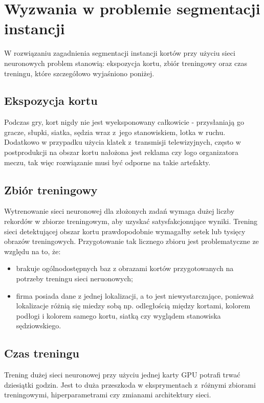 \section{Wyzwania w problemie segmentacji instancji}
\label{sec:wyzwania}

W rozwiązaniu zagadnienia segmentacji instancji kortów przy użyciu sieci neuronowych problem stanowią: ekspozycja kortu, zbiór treningowy oraz czas treningu, które szczegółowo wyjaśniono poniżej.

\subsection*{Ekspozycja kortu}

Podczas gry, kort nigdy nie jest wyeksponowany całkowicie - przysłaniają go gracze, słupki, siatka, sędzia wraz z~jego stanowiskiem, lotka w ruchu.
Dodatkowo w przypadku użycia klatek z~transmisji telewizyjnych, często w postprodukcji na obszar kortu nałożona jest reklama czy logo organizatora meczu,  tak więc rozwiązanie musi być odporne na takie artefakty.

\subsection*{Zbiór treningowy}

Wytrenowanie sieci neuronowej dla złożonych zadań wymaga dużej liczby rekordów w zbiorze treningowym, aby uzyskać satysfakcjonujące wyniki.
Trening sieci detektującej obszar kortu prawdopodobnie wymagałby setek lub tysięcy obrazów treningowych.
Przygotowanie tak licznego zbioru jest problematyczne ze względu na to, że:

\begin{itemize}
	\item brakuje ogólnodostępnych baz z obrazami kortów przygotowanych na potrzeby treningu sieci neruonowych;
	\item firma posiada dane z jednej lokalizacji, a to jest niewystarczające, ponieważ lokalizacje różnią się miedzy sobą np. odległością między kortami, kolorem podłogi i kolorem samego kortu, siatką czy wyglądem stanowiska sędziowskiego.
\end{itemize}

\subsection*{Czas treningu}

Trening dużej sieci neuronowej przy użyciu jednej karty GPU potrafi trwać dziesiątki godzin.
Jest to duża przeszkoda w eksprymentach z~różnymi zbiorami treningowymi, hiperparametrami czy zmianami architektury sieci.
